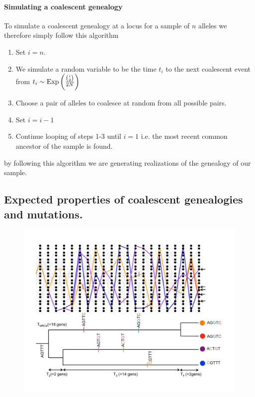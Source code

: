 \paragraph{Simulating a coalescent genealogy}
To simulate a coalescent genealogy at a locus for a sample of $n$ alleles we therefore simply follow this
algorithm
\begin{enumerate}
\item Set $i=n$.
\item We simulate a random variable to be the time $t_i$ to the next coalescent event from $t_i \sim
  \text{Exp}\left(\nicefrac{{i \choose
 2}}{2N} \right)$
\item Choose a pair of alleles to coalesce at random from all possible
 pairs.
\item Set $i=i-1$
\item Continue looping of steps 1-3 until $i=1$ i.e. the most recent
 common ancestor of the sample is found.
\end{enumerate}
by following this algorithm we are generating realizations of the
genealogy of our sample. \\



\subsection{Expected properties of coalescent genealogies and
  mutations.} 

\begin{figure}
\begin{center}
\includegraphics[width= \textwidth]{figures/Coalescent/Coal_w_muts.pdf}
\end{center}
\caption{ } \label{fig:Coal_w_muts}
\end{figure}


